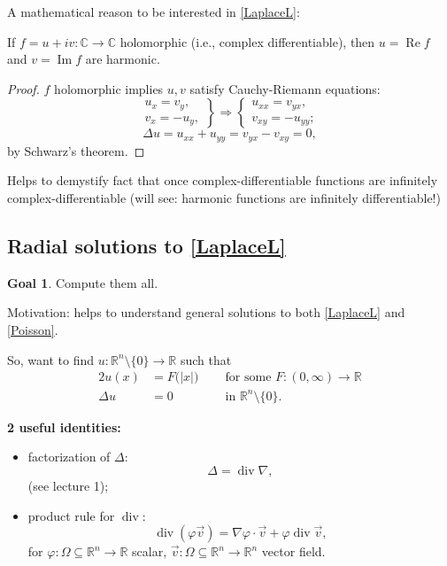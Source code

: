 \documentclass[12pt]{article}
\DeclareMathOperator{\diver}{div}
\DeclareMathOperator{\Real}{Re}
\DeclareMathOperator{\Img}{Im}
\theoremstyle{definition}
\newtheorem*{goal}{Goal}
\begin{document}
A mathematical reason to be interested in \eqref{LaplaceL}:

If $f=u+iv:\mathbb{C}\rightarrow\mathbb{C}$ holomorphic (i.e., complex differentiable), then $u=\Real f$ and $v=\Img f$ are harmonic.

\begin{proof}
$f$ holomorphic implies $u,v$ satisfy Cauchy-Riemann equations:
\[\left.\begin{array}{r}u_x=v_y,\\v_x=-u_y,\end{array}\right\}\Rightarrow\left\{\begin{array}{l}u_{xx}=v_{yx},\\v_{xy}=-u_{yy};\end{array}\right.\]
\[\Delta u=u_{xx}+u_{yy}=v_{yx}-v_{xy}=0,\]
by Schwarz's theorem.
\end{proof}

Helps to demystify fact that once complex-differentiable functions are infinitely complex-differentiable (will see: harmonic functions are infinitely differentiable!)

\subsection{Radial solutions to \texorpdfstring{\eqref{LaplaceL}}{(L)}}
\begin{goal}
Compute them all.
\end{goal}

Motivation: helps to understand general solutions to both \eqref{LaplaceL} and \eqref{Poisson}.

So, want to find $u:\mathbb{R}^n\setminus\{0\}\rightarrow\mathbb{R}$ such that
\begin{alignat*}{2}
u(x)&=F\big(|x|\big)\ &&\text{ for some }F:(0,\infty)\rightarrow\mathbb{R}\\
\Delta u&=0&&\text{ in }\mathbb{R}^n\setminus\{0\}.
\end{alignat*}

\textbf{2 useful identities:}
\begin{itemize}
\item factorization of $\Delta$:
\[\Delta=\diver\nabla,\]
(see lecture 1);
\item product rule for $\diver$:
\[\diver(\varphi\vec{v})=\nabla\varphi\cdot\vec{v}+\varphi\diver\vec{v},\]
for $\varphi:\Omega\subseteq\mathbb{R}^n\rightarrow\mathbb{R}$ scalar, $\vec{v}:\Omega\subseteq\mathbb{R}^n\rightarrow\mathbb{R}^n$ vector field.
\end{itemize}
\end{document}
